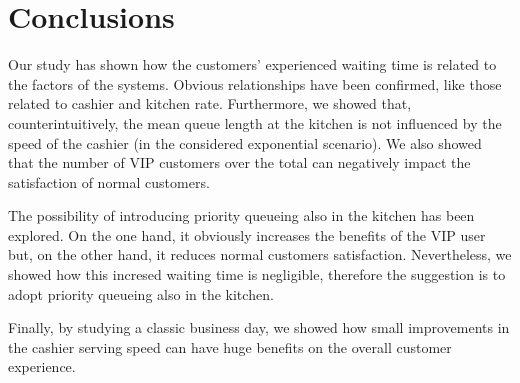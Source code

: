 \section{Conclusions}
Our study has shown how the customers' experienced waiting time is related to the factors of the systems. Obvious relationships have been confirmed, like those related to cashier and kitchen rate. 
Furthermore, we showed that, counterintuitively, the mean queue length at the kitchen is not influenced by the speed of the cashier (in the considered exponential scenario). 
We also showed that the number of VIP customers over the total can negatively impact the satisfaction of normal customers.

The possibility of introducing priority queueing also in the kitchen has been explored. On the one hand, it obviously increases the benefits of the VIP user but, on the other hand, it reduces normal customers satisfaction. Nevertheless, we showed how this incresed waiting time is negligible, therefore the suggestion is to adopt priority queueing also in the kitchen.

Finally, by studying a classic business day, we showed how small improvements in the cashier serving speed can have huge benefits on the overall customer experience.

